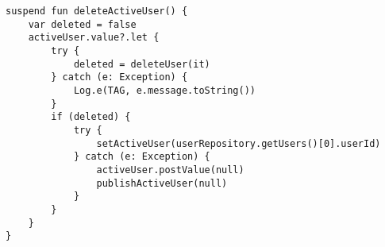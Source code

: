 \begin{lstlisting}[caption={User deletion function (UserViewModel)}]
suspend fun deleteActiveUser() {
    var deleted = false
    activeUser.value?.let {
        try {
            deleted = deleteUser(it)
        } catch (e: Exception) {
            Log.e(TAG, e.message.toString())
        }
        if (deleted) {
            try {
                setActiveUser(userRepository.getUsers()[0].userId)
            } catch (e: Exception) {
                activeUser.postValue(null)
                publishActiveUser(null)
            }
        }
    }
}
\end{lstlisting}
